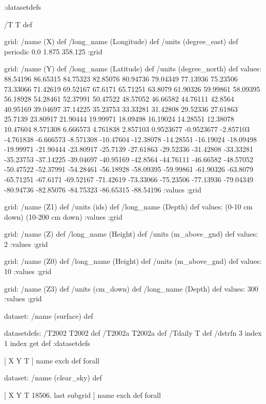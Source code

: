 \begin{ingrid}

:datasetdefs

/T T def

grid:
/name (X) def
/long_name (Longitude) def
/units (degree_east) def
periodic
0.0 1.875 358.125
:grid

grid:
/name (Y) def
/long_name (Latitude) def
/units (degree_north) def
values: 88.54196 86.65315 84.75323 82.85076 80.94736 79.04349 77.13936 75.23506 73.33066 71.42619 69.52167 67.6171 65.71251 63.8079 61.90326 59.99861 58.09395 56.18928 54.28461 52.37991 50.47522 48.57052 46.66582 44.76111 42.8564 40.95169 39.04697 37.14225 35.23753 33.33281 31.42808 29.52336 27.61863 25.7139 23.80917 21.90444 19.99971 18.09498 16.19024 14.28551 12.38078 10.47604 8.571308 6.666573 4.761838 2.857103 0.9523677 -0.9523677 -2.857103 -4.761838 -6.666573 -8.571308 -10.47604 -12.38078 -14.28551 -16.19024 -18.09498 -19.99971 -21.90444 -23.80917 -25.7139 -27.61863 -29.52336 -31.42808 -33.33281 -35.23753 -37.14225 -39.04697 -40.95169 -42.8564 -44.76111 -46.66582 -48.57052 -50.47522 -52.37991 -54.28461 -56.18928 -58.09395 -59.99861 -61.90326 -63.8079 -65.71251 -67.6171 -69.52167 -71.42619 -73.33066 -75.23506 -77.13936 -79.04349 -80.94736 -82.85076 -84.75323 -86.65315 -88.54196 :values
:grid

grid:
/name (Z1) def
/units (ids) def
/long_name (Depth) def
values: (0-10 cm down) (10-200 cm down) :values
:grid

grid:
/name (Z) def
/long_name (Height) def
/units (m_above_gnd) def
values: 2 :values
:grid

grid:
/name (Z0) def
/long_name (Height) def
/units (m_above_gnd) def
values: 10 :values
:grid

grid:
/name (Z3) def
/units (cm_down) def
/long_name (Depth) def
values: 300 :values
:grid


 dataset: /name (surface) def

  datasetdefs:
  /T2002 T2002 def
  /T2002a T2002a def
  /Tdaily T def
  /dstrfn 3 index 1 index get def
  :datasetdefs

  [ X Y T ] { name exch def } forall

 
  dataset: /name (clear_sky) def

   [ X Y T 18506. last subgrid ] { name exch def } forall


\end{ingrid}
